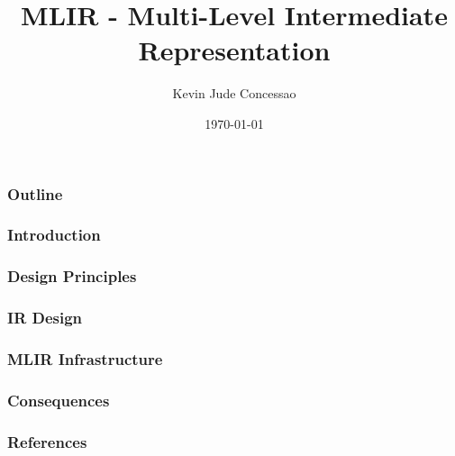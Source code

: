 \documentclass{beamer}
\title{MLIR - Multi-Level Intermediate Representation}
\author{Kevin Jude Concessao}
\institute{IIT Palakkad}
\date{\today}
\begin{document}
\begin{frame}
  \titlepage
\end{frame}

\begin{frame}
  \frametitle{Outline}
  \tableofcontents
\end{frame}

\begin{frame}
  \frametitle{Introduction}
\end{frame}

\begin{frame}
  \frametitle{Design Principles}
\end{frame}

\begin{frame}
  \frametitle{IR Design}
\end{frame}

\begin{frame}
  \frametitle{MLIR Infrastructure}
\end{frame}

\begin{frame}
  \frametitle{Consequences}
\end{frame}

\nocite{*}

\begin{frame}
  \frametitle{References}
  \printbibliography
\end{frame}
\end{document}
